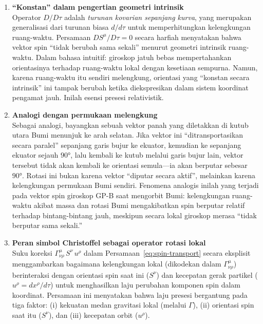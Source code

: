 \begin{enumerate}[label=(\alph*), wide=0pt, leftmargin=*]
    \item \textbf{``Konstan'' dalam pengertian geometri intrinsik}\\
    Operator $D/D\tau$ adalah \textit{turunan kovarian sepanjang kurva}, yang merupakan generalisasi dari turunan biasa $d/d\tau$ untuk memperhitungkan kelengkungan ruang-waktu. Persamaan $DS^\mu/D\tau = 0$ secara harfiah menyatakan bahwa vektor spin ``tidak berubah sama sekali'' menurut geometri intrinsik ruang-waktu. Dalam bahasa intuitif: giroskop jatuh bebas mempertahankan orientasinya terhadap ruang-waktu lokal dengan kesetiaan sempurna. Namun, karena ruang-waktu itu sendiri melengkung, orientasi yang ``konstan secara intrinsik'' ini tampak berubah ketika diekspresikan dalam sistem koordinat pengamat jauh. Inilah esensi presesi relativistik.

    \item \textbf{Analogi dengan permukaan melengkung}\\
    Sebagai analogi, bayangkan sebuah vektor panah yang diletakkan di kutub utara Bumi menunjuk ke arah selatan. Jika vektor ini ``ditransportasikan secara paralel'' sepanjang garis bujur ke ekuator, kemudian ke sepanjang ekuator sejauh $90°$, lalu kembali ke kutub melalui garis bujur lain, vektor tersebut tidak akan kembali ke orientasi semula---ia akan berputar sebesar $90°$. Rotasi ini bukan karena vektor ``diputar secara aktif'', melainkan karena kelengkungan permukaan Bumi sendiri. Fenomena analogis inilah yang terjadi pada vektor spin giroskop GP-B saat mengorbit Bumi: kelengkungan ruang-waktu akibat massa dan rotasi Bumi mengakibatkan spin berputar relatif terhadap bintang-bintang jauh, meskipun secara lokal giroskop merasa ``tidak berputar sama sekali.''

    \item \textbf{Peran simbol Christoffel sebagai operator rotasi lokal}\\
    Suku koreksi $\Gamma^\mu_{\nu\rho}\, S^\nu\, u^\rho$ dalam Persamaan~\eqref{eq:spin-transport} secara eksplisit menggambarkan bagaimana kelengkungan lokal (dikodekan dalam $\Gamma^\mu_{\nu\rho}$) berinteraksi dengan orientasi spin saat ini ($S^\nu$) dan kecepatan gerak partikel ($u^\rho = dx^\rho/d\tau$) untuk menghasilkan laju perubahan komponen spin dalam koordinat. Persamaan ini menyatakan bahwa laju presesi bergantung pada tiga faktor: (i) kekuatan medan gravitasi lokal (melalui $\Gamma$), (ii) orientasi spin saat itu ($S^\nu$), dan (iii) kecepatan orbit ($u^\rho$).
\end{enumerate}

